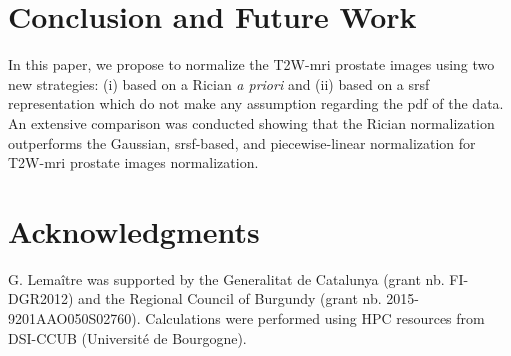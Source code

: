 \section{Conclusion and Future Work}
\label{sec:con}
In this paper, we propose to normalize the T2W-\ac{mri} prostate images using two new strategies: (i) based on a Rician \textit{a priori} and (ii) based on a \ac{srsf} representation which do not make any assumption regarding the \ac{pdf} of the data.
An extensive comparison was conducted showing that the Rician normalization outperforms the Gaussian, \ac{srsf}-based, and piecewise-linear normalization for T2W-\ac{mri} prostate images normalization.

\section*{Acknowledgments}

G. Lema\^itre was supported by the Generalitat de Catalunya (grant nb. FI-DGR2012) and the Regional Council of Burgundy (grant nb. 2015-9201AAO050S02760).
Calculations were performed using HPC resources from DSI-CCUB (Universit\'e de Bourgogne).

